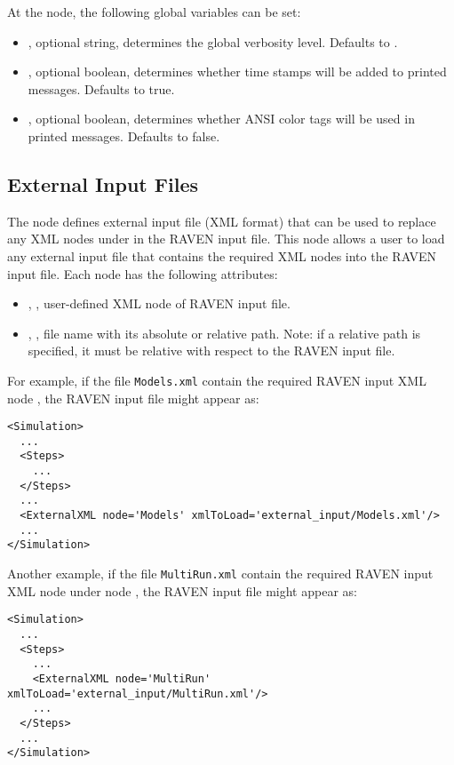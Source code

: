 At the  node, the following global variables can be set:
\begin{itemize}
  \item {}, optional string, determines the global verbosity level.  Defaults to
    .
  \item {}, optional boolean, determines whether time stamps will be added to printed
    messages.  Defaults to true.
  \item {}, optional boolean, determines whether ANSI color tags will be used in printed
    messages.  Defaults to false.
\end{itemize}


\subsection{External Input Files}
The  node defines external input file (XML format) that can be used to replace any XML nodes 
under  in the RAVEN input file. This node allows a user to load any external input file that contains 
the required XML nodes into the RAVEN input file. Each  node has the following attributes:
\begin{itemize}
\item {}, , user-defined XML node of RAVEN input file. 
\item {}, , file name with its absolute or relative path. Note: if a 
relative path is specified, it must be relative with respect to the RAVEN input file.
\end{itemize}
%
For example, if the file \texttt{Models.xml} contain the required RAVEN input XML node , 
the RAVEN input file might appear as: 
%
\begin{lstlisting}[style=XML,morekeywords={node,xmlToLoad}]  
<Simulation>
  ...
  <Steps>
    ...
  </Steps>
  ...
  <ExternalXML node='Models' xmlToLoad='external_input/Models.xml'/>
  ...
</Simulation>
\end{lstlisting}
%
Another example, if the file \texttt{MultiRun.xml} contain the required RAVEN input XML node  
under node , the RAVEN input file might appear as:
\begin{lstlisting}[style=XML,morekeywords={node,xmlToLoad}]  
<Simulation>
  ...
  <Steps>
    ...
    <ExternalXML node='MultiRun' xmlToLoad='external_input/MultiRun.xml'/>
    ...
  </Steps>
  ...
</Simulation>
\end{lstlisting}
